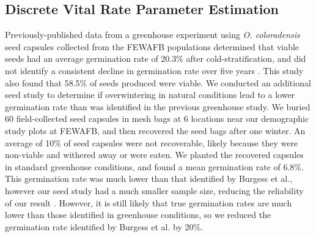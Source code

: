\documentclass[12pt, letterpaper]{article}
\begin{document}
\subsection{Discrete Vital Rate Parameter Estimation}
 Previously-published data from a greenhouse experiment using \textit{O. coloradensis} seed capsules collected from the FEWAFB populations determined that viable seeds had an average germination rate of 20.3\% after cold-stratification, and did not identify a consistent decline in germination rate over five years \cite{Burgess2005CapsuleColoradensis}. This study also found that 58.5\% of seeds produced were viable. We conducted an additional seed study to determine if overwintering in natural conditions lead to a lower germination rate than was identified in the previous greenhouse study. We buried 60 field-collected seed capsules in mesh bags at 6 locations near our demographic study plots at FEWAFB, and then recovered the seed bags after one winter. An average of 10\% of seed capsules were not recoverable, likely because they were non-viable and withered away or were eaten. We planted the recovered capsules in standard greenhouse conditions, and found a mean germination rate of 6.8\%. This germination rate was much lower than that identified by Burgess et al., however our seed study had a much smaller sample size, reducing the reliability of our result \cite{Burgess2005CapsuleColoradensis}. However, it is still likely that true germination rates are much lower than those identified in greenhouse conditions, so we reduced the germination rate identified by Burgess et al. by 20\%. 
\end{document}
